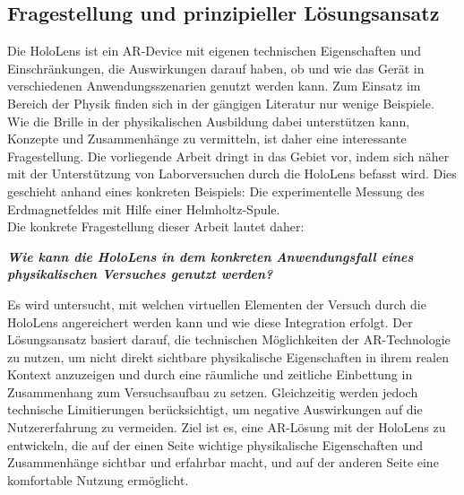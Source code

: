 
\subsection{Fragestellung und prinzipieller Lösungsansatz}
\label{sec-1-2}
Die HoloLens ist ein AR-Device mit eigenen technischen Eigenschaften und Einschränkungen, die Auswirkungen darauf haben, ob und wie das Gerät in verschiedenen Anwendungsszenarien genutzt werden kann. Zum Einsatz im Bereich der Physik finden sich in der gängigen Literatur nur wenige Beispiele. Wie die Brille in der physikalischen Ausbildung dabei unterstützen kann, Konzepte und Zusammenhänge zu vermitteln, ist daher eine interessante Fragestellung. Die vorliegende Arbeit dringt in das Gebiet vor, indem sich näher mit der Unterstützung von Laborversuchen durch die HoloLens befasst wird. Dies geschieht anhand eines konkreten Beispiels: Die experimentelle Messung des Erdmagnetfeldes mit Hilfe einer Helmholtz-Spule.\\

Die konkrete Fragestellung dieser Arbeit lautet daher:
\begin{center}
	\textit{\textbf{Wie kann die HoloLens in dem konkreten Anwendungsfall eines physikalischen Versuches genutzt werden?}}
\end{center}

Es wird untersucht, mit welchen virtuellen Elementen der Versuch durch die HoloLens angereichert werden kann und wie diese Integration erfolgt. Der Lösungsansatz basiert darauf, die technischen Möglichkeiten der AR-Technologie zu nutzen, um nicht direkt sichtbare physikalische Eigenschaften in ihrem realen Kontext anzuzeigen und durch eine räumliche und zeitliche Einbettung in Zusammenhang zum Versuchsaufbau zu setzen. Gleichzeitig werden jedoch technische Limitierungen berücksichtigt, um negative Auswirkungen auf die Nutzererfahrung zu vermeiden. Ziel ist es, eine AR-Lösung mit der HoloLens zu entwickeln, die auf der einen Seite wichtige physikalische Eigenschaften und Zusammenhänge sichtbar und erfahrbar macht, und auf der anderen Seite eine komfortable Nutzung ermöglicht.

